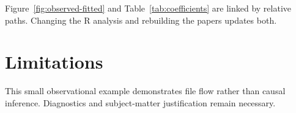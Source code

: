 \documentclass[aos]{imsart}
\numberwithin{equation}{section}
\begin{document}
\begin{table}[htbp]
  \centering
  \caption{Regression coefficients generated by R.}
  \label{tab:coefficients}
  
\end{table}

Figure~\ref{fig:observed-fitted} and Table~\ref{tab:coefficients} are linked by
relative paths. Changing the R analysis and rebuilding the papers updates both.

\section{Limitations}

This small observational example demonstrates file flow rather than causal
inference. Diagnostics and subject-matter justification remain necessary.



\end{document}
